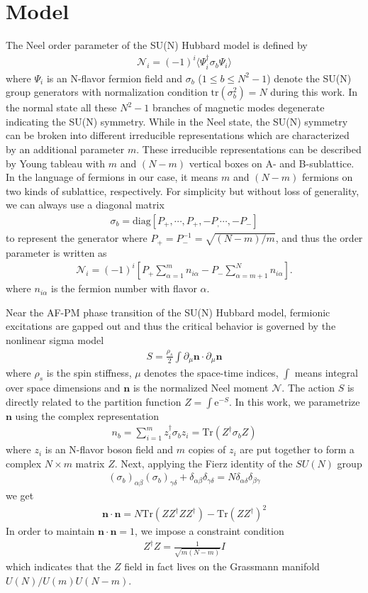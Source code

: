 \documentclass[aps,twocolumn,superscriptaddress]{revtex4-1}
\newcommand{\bea}{\begin{eqnarray}}
\newcommand{\eea}{\end{eqnarray}}
\newcommand{\bn}{\mathbf{n}}
\newcommand{\me}{\mathrm{e}}
\begin{document}
\section{Model}
The Neel order parameter of the SU(N) Hubbard model is defined by \bea \mathcal{N}_i=(-1)^i\langle \Psi_i^\dagger \sigma_b \Psi_i\rangle \eea where $\Psi_i$ is an N-flavor fermion field and $\sigma_b$ ($1\le b\le N^2-1$) denote the SU(N) group generators with normalization condition $\mathrm{tr}(\sigma_b^2)=N$ during this work. In the normal state all these $N^2-1$ branches of magnetic modes degenerate indicating the SU(N) symmetry. While in the Neel state, the SU(N) symmetry can be broken into different irreducible representations which are characterized by an additional parameter $m$. These irreducible representations can be described by Young tableau with $m$ and $(N-m)$ vertical boxes on A- and B-sublattice. In the language of fermions in our case, it means $m$ and $(N-m)$ fermions on two kinds of sublattice, respectively. For simplicity but without loss of generality, we can always use a diagonal matrix \bea \sigma_b=\text{diag}\left[P_+,\cdots,P_+,-P_,\cdots,-P_-\right] \eea to represent the generator where $P_+=P_-^{-1}=\sqrt{(N-m)/m}$, and thus the order parameter is written as \bea \mathcal{N}_i=(-1)^i\left[P_+\sum_{\alpha=1}^m n_{i\alpha}-P_-\sum_{\alpha=m+1}^{N}n_{i\alpha} \right]. \eea where $n_{i\alpha}$ is the fermion number with flavor $\alpha$. 

Near the AF-PM phase transition of the SU(N) Hubbard model, fermionic excitations are gapped out and thus the critical behavior is governed by the nonlinear sigma model
\bea \label{eq:NLsM}S=\frac{\rho_s}{2}\int \partial_\mu\bn \cdot \partial_\mu\bn \eea
where $\rho_s$ is the spin stiffness, $\mu$ denotes the space-time indices, $\int$ means integral over space dimensions and $\bn$ is the normalized Neel moment $\mathcal{N}$. The action $S$ is directly related to the partition function $Z=\int \me^{-S}$. In this work, we parametrize $\bn$ using the complex representation \bea \label{eq:cprep}n_b=\sum_{i=1}^m z_i^\dag \sigma_b z_i=\mathrm{Tr}(Z^\dag\sigma_b Z) \eea where $z_i$ is an N-flavor boson field and $m$ copies of $z_i$ are put together to form a complex $N\times m$ matrix $Z$. Next, applying the Fierz identity of the $SU(N)$ group
\bea \label{eq:Fierz} (\sigma_b)_{\alpha\beta} (\sigma_b)_{\gamma\delta}+\delta_{\alpha\beta}\delta_{\gamma\delta}=N\delta_{\alpha\delta}\delta_{\beta\gamma} \eea
we get
\bea \bn\cdot\bn = N\mathrm{Tr}(ZZ^\dag Z Z^\dag)-\mathrm{Tr}(ZZ^\dag)^2 \eea
In order to maintain $\bn\cdot\bn=1$, we impose a constraint condition \bea Z^\dag Z=\frac{1}{\sqrt{m(N-m)}}I \label{eq:normalizeZ}\eea
which indicates that the $Z$ field in fact lives on the Grassmann manifold $U(N)/U(m)U(N-m)$. 
\end{document}
